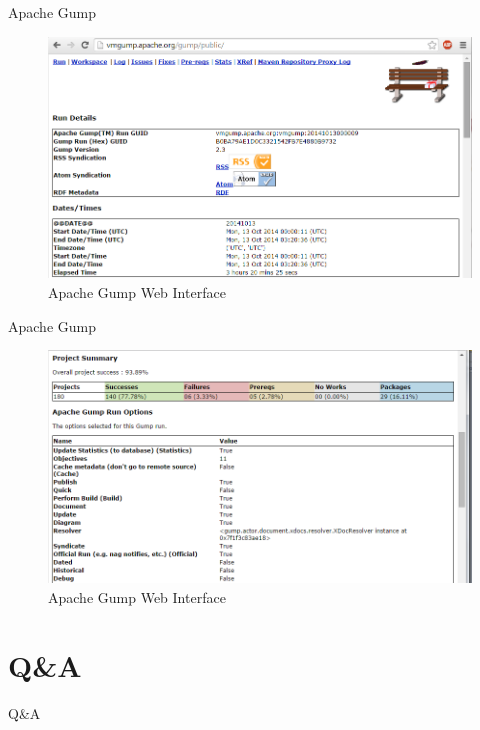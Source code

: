 \documentclass{beamer}
\begin{document}
\begin{frame}{Apache Gump}
\begin{figure}
  \centering
  \includegraphics[scale=0.35]{images/apache_gump.png}
  \caption{Apache Gump Web Interface}
\end{figure}
\end{frame}


\begin{frame}{Apache Gump}
\begin{figure}
  \centering
  \includegraphics[scale=0.35]{images/apache_gump2.png}
  \caption{Apache Gump Web Interface}
\end{figure}
\end{frame}

\section{Q\&A}
\begin{frame}{Q\&A}
\end{frame}
\end{document}
